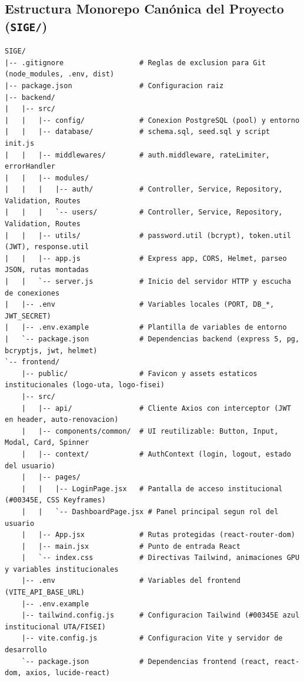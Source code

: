 \documentclass[11pt,a4paper]{article}
\begin{document}
\subsection{Estructura Monorepo Canónica del Proyecto (\texttt{SIGE/})}
\begin{lstlisting}
SIGE/
|-- .gitignore                  # Reglas de exclusion para Git (node_modules, .env, dist)
|-- package.json                # Configuracion raiz
|-- backend/
|   |-- src/
|   |   |-- config/             # Conexion PostgreSQL (pool) y entorno
|   |   |-- database/           # schema.sql, seed.sql y script init.js
|   |   |-- middlewares/        # auth.middleware, rateLimiter, errorHandler
|   |   |-- modules/
|   |   |   |-- auth/           # Controller, Service, Repository, Validation, Routes
|   |   |   `-- users/          # Controller, Service, Repository, Validation, Routes
|   |   |-- utils/              # password.util (bcrypt), token.util (JWT), response.util
|   |   |-- app.js              # Express app, CORS, Helmet, parseo JSON, rutas montadas
|   |   `-- server.js           # Inicio del servidor HTTP y escucha de conexiones
|   |-- .env                    # Variables locales (PORT, DB_*, JWT_SECRET)
|   |-- .env.example            # Plantilla de variables de entorno
|   `-- package.json            # Dependencias backend (express 5, pg, bcryptjs, jwt, helmet)
`-- frontend/
    |-- public/                 # Favicon y assets estaticos institucionales (logo-uta, logo-fisei)
    |-- src/
    |   |-- api/                # Cliente Axios con interceptor (JWT en header, auto-renovacion)
    |   |-- components/common/  # UI reutilizable: Button, Input, Modal, Card, Spinner
    |   |-- context/            # AuthContext (login, logout, estado del usuario)
    |   |-- pages/
    |   |   |-- LoginPage.jsx   # Pantalla de acceso institucional (#00345E, CSS Keyframes)
    |   |   `-- DashboardPage.jsx # Panel principal segun rol del usuario
    |   |-- App.jsx             # Rutas protegidas (react-router-dom)
    |   |-- main.jsx            # Punto de entrada React
    |   `-- index.css           # Directivas Tailwind, animaciones GPU y variables institucionales
    |-- .env                    # Variables del frontend (VITE_API_BASE_URL)
    |-- .env.example
    |-- tailwind.config.js      # Configuracion Tailwind (#00345E azul institucional UTA/FISEI)
    |-- vite.config.js          # Configuracion Vite y servidor de desarrollo
    `-- package.json            # Dependencias frontend (react, react-dom, axios, lucide-react)
\end{lstlisting}
\end{document}
